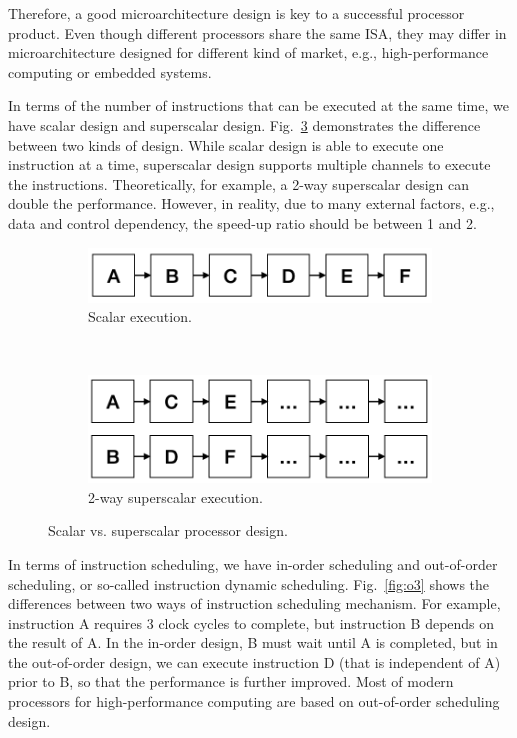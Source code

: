 Therefore, a good microarchitecture design is key to a successful processor product. Even though different processors share the same ISA, they may differ in microarchitecture designed for different kind of market, e.g., high-performance computing or embedded systems.

In terms of the number of instructions that can be executed at the same time, we have scalar design and superscalar design. Fig.~\ref{fig:superscalar} demonstrates the difference between two kinds of design. While scalar design is able to execute one instruction at a time, superscalar design supports multiple channels to execute the instructions. Theoretically, for example, a 2-way superscalar design can double the performance. However, in reality, due to many external factors, e.g., data and control dependency, the speed-up ratio should be between 1 and 2.

\begin{figure}[!htp]
    \centering
    \begin{subfigure}{0.4\textwidth}
      \includegraphics[width=\textwidth]{figure/scalar.png}
      \caption{Scalar execution.}
      \label{fig:superscalar-1}
  \end{subfigure}
  ~
  \begin{subfigure}{0.4\textwidth}
      \includegraphics[width=\textwidth]{figure/superscalar.png}
      \caption{2-way superscalar execution.}
      \label{fig:superscalar-2}
  \end{subfigure}
  \caption{Scalar vs. superscalar processor design.}
  \label{fig:superscalar}
\end{figure}

In terms of instruction scheduling, we have in-order scheduling and out-of-order scheduling, or so-called instruction dynamic scheduling. Fig.~\ref{fig:o3} shows the differences between two ways of instruction scheduling mechanism. For example, instruction A requires 3 clock cycles to complete, but instruction B depends on the result of A. In the in-order design, B must wait until A is completed, but in the out-of-order design, we can execute instruction D (that is independent of A) prior to B, so that the performance is further improved. Most of modern processors for high-performance computing are based on out-of-order scheduling design.

